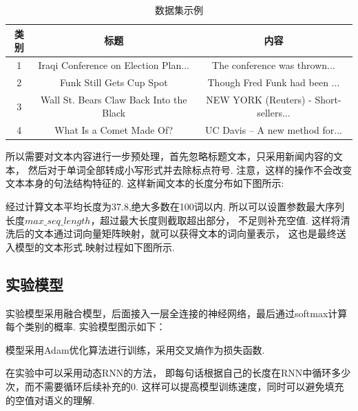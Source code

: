 \documentclass[bachelor,adobefonts]{jnuthesis}
\begin{document}
\begin{table}[h!]
  \centering
  \begin{tabular}{ccc}
    \toprule
    \textbf{类别} & \textbf{标题} & \textbf{内容}\\
    \midrule
    1 & Iraqi Conference on Election Plan...& The conference was thrown... \\
    2 & Funk Still Gets Cup Spot & Though Fred Funk had been ... \\
    3 & Wall St. Bears Claw Back Into the Black &  NEW YORK (Reuters) - Short-sellers... \\
    4 & What Is a Comet Made Of? & UC Davis -- A new method for... \\
    \bottomrule
  \end{tabular}
  \caption{数据集示例}
\end{table}


所以需要对文本内容进行一步预处理，首先忽略标题文本，只采用新闻内容的文本，
然后对于单词全部转成小写形式并去除标点符号.
注意，这样的操作不会改变文本本身的句法结构特征的.
这样新闻文本的长度分布如下图所示:


经过计算文本平均长度为37.8,绝大多数在100词以内.
所以可以设置参数最大序列长度$max\_seq\_length$，超过最大长度则截取超出部分，
不足则补充空值.
这样将清洗后的文本通过词向量矩阵映射，就可以获得文本的词向量表示，
这也是最终送入模型的文本形式.映射过程如下图所示.



\subsection{实验模型}
实验模型采用融合模型，后面接入一层全连接的神经网络，最后通过softmax计算每个类别的概率.
实验模型图示如下：

模型采用Adam优化算法\cite{Kingma2014Adam}进行训练，采用交叉熵作为损失函数.

在实验中可以采用动态RNN的方法，
即每句话根据自己的长度在RNN中循环多少次，而不需要循环后续补充的0.
这样可以提高模型训练速度，同时可以避免填充的空值对语义的理解.
\end{document}
